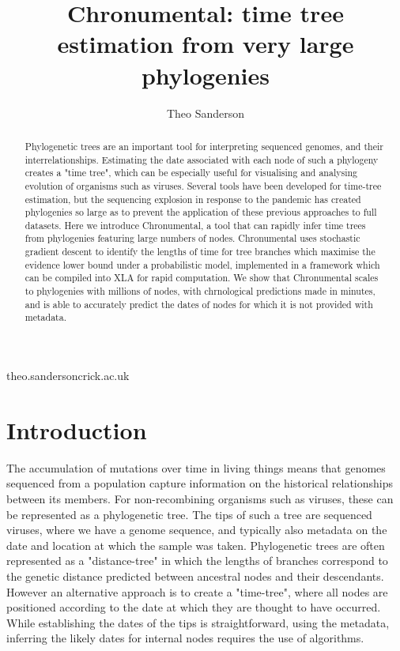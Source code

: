
\title{Chronumental: time tree estimation from very large phylogenies}

\author[1,2]{Theo Sanderson}

\date{}

\maketitle

\begin{abstract}
Phylogenetic trees are an important tool for interpreting sequenced genomes, and their interrelationships. Estimating the date associated with each node of such a phylogeny creates a "time tree", which can be especially useful for visualising and analysing evolution of organisms such as viruses. Several tools have been developed for time-tree estimation, but the sequencing explosion in response to the pandemic has created phylogenies so large as to prevent the application of these previous approaches to full datasets. Here we introduce Chronumental, a tool that can rapidly infer time trees from phylogenies featuring large numbers of nodes. Chronumental uses stochastic gradient descent to identify the lengths of time for tree branches which maximise the evidence lower bound under a probabilistic model, implemented in a framework which can be compiled into XLA for rapid computation. We show that Chronumental scales to phylogenies with millions of nodes, with chrnological predictions made in minutes, and is able to accurately predict the dates of nodes for which it is not provided with metadata.
\end{abstract}

\begin{corrauthor}
theo.sanderson\at crick.ac.uk
\end{corrauthor}



\section*{Introduction}\label{s:introduction}
The accumulation of mutations over time in living things means that genomes sequenced from a population capture information on the historical relationships between its members. For non-recombining organisms such as viruses, these can be represented as a phylogenetic tree. The tips of such a tree are sequenced viruses, where we have a genome sequence, and typically also metadata on the date and location at which the sample was taken. Phylogenetic trees are often represented as a "distance-tree" in which the lengths of branches correspond to the genetic distance predicted between ancestral nodes and their descendants. However an alternative approach is to create a "time-tree", where all nodes are positioned according to the date at which they are thought to have occurred. While establishing the dates of the tips is straightforward, using the metadata, inferring the likely dates for internal nodes requires the use of algorithms.



